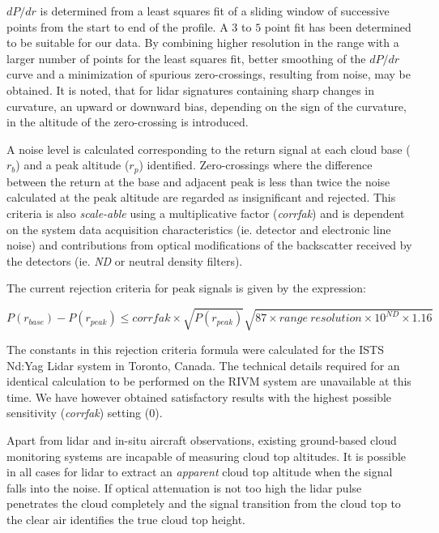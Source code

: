 $dP/dr$ is determined from a least squares fit
of a sliding window of successive points
from the start to  end of the profile. 
A  $3$ to $5$ point fit has been determined to be suitable for
our data. By combining higher resolution in the range
with a larger number of points for the least squares fit, better smoothing
of the $dP/dr$ curve and a minimization of spurious zero-crossings, resulting 
from noise, may be obtained. It is noted, that for lidar signatures 
containing sharp changes in curvature, an upward or downward bias, 
depending on the sign of the curvature, 
in the altitude of the zero-crossing is introduced.  


A noise level is calculated corresponding to the return
signal at each cloud base ($r_{b}$) 
and a peak altitude ($r_{p}$) identified.
Zero-crossings where the difference between the return
at the base and adjacent peak is less than twice the noise
calculated at the peak altitude are regarded as insignificant 
and rejected. This criteria is also {\em scale-able} using a multiplicative
factor ({\em corrfak}) and is dependent on the system data acquisition
characteristics (ie. detector and electronic line noise) and 
contributions from optical modifications of the backscatter 
received by the detectors (ie. {\em ND} or neutral density filters).

The current rejection criteria for peak signals is given by the expression:

$$
P(r_{base})-P(r_{peak}) \leq corrfak \times 
\sqrt{P(r_{peak})}\sqrt{87 \times {range
\: resolution} \times {10^{ND}} \times 1.16}
$$

The constants in this rejection criteria formula were 
calculated for the ISTS Nd:Yag Lidar system in Toronto, 
Canada. The technical details required for an identical 
calculation to be performed on the RIVM system are
unavailable at this time. We have however obtained 
satisfactory results with the highest possible
sensitivity ({\em corrfak}) setting (0).

Apart from lidar and in-situ aircraft observations, 
existing ground-based cloud monitoring systems 
are incapable of measuring cloud top altitudes.
It is possible in all cases for lidar to extract
an {\em apparent} cloud top altitude when the signal
falls into the noise. If optical attenuation is not too high 
the lidar pulse penetrates the cloud completely and 
the signal transition from the cloud top to the clear air 
identifies the true cloud top height.

